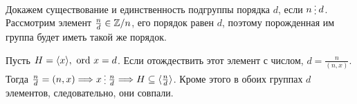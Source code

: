 \begin{myproof*}
\begin{itemize}
	    Докажем существование и единственность подгруппы порядка  $ d$, если  $ n \del d$. Рассмотрим элемент   $ \frac{n}{d} \in  \mathbb{Z} /n$, его порядок равен $ d$, поэтому порожденная им группа будет иметь такой же порядок.

	    Пусть  $ H = \langle x \rangle, ~ {\mathop{\text{\rm ord}}}~ x = d$. Если отождествить этот элемент с числом,  $ d = \frac{n}{(n, x)}$. Тогда $ \frac{n}{d} = (n, x) \Longrightarrow x \del \frac{n}{d} \Longrightarrow  H \subseteq \langle \frac{n}{d} \rangle$. Кроме этого в обоих группах $ d$ элементов, следовательно, они совпали.
    \end{itemize}
\end{myproof*}
% 

